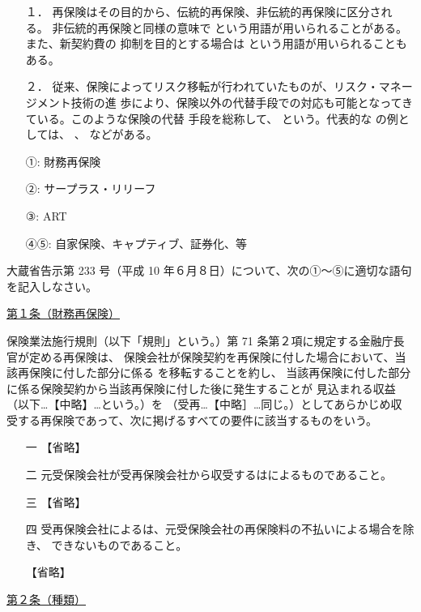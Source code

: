 \documentclass[report,gutter=10mm,fore-edge=10mm,uplatex,dvipdfmx]{jlreq}
\begin{document}
\begin{itemize}
\item[１．] 再保険はその目的から、伝統的再保険、非伝統的再保険に区分される。
 非伝統的再保険と同様の意味で
 という用語が用いられることがある。また、新契約費の
 抑制を目的とする場合は
 という用語が用いられることもある。

\item[２．] 
従来、保険によってリスク移転が行われていたものが、リスク・マネージメント技術の進
 歩により、保険以外の代替手段での対応も可能となってきている。このような保険の代替
 手段を総称して、  という。代表的な  の例としては、
 、  などがある。
\end{itemize}
\answer{}
\begin{itemize}
\item[ ①: ] 財務再保険
\item[ ②: ] サープラス・リリーフ
\item[ ③: ] ART
\item[ ④⑤: ] 自家保険、キャプティブ、証券化、等
\end{itemize}

大蔵省告示第 233 号（平成 10 年６月８日）について、次の①～⑤に適切な語句を記入しなさい。

\noindent \underline{第１条（財務再保険）}

保険業法施行規則（以下「規則」という。）第 71 条第２項に規定する金融庁長官が定める再保険は、
保険会社が保険契約を再保険に付した場合において、当該再保険に付した部分に係る
を移転することを約し、
当該再保険に付した部分に係る保険契約から当該再保険に付した後に発生することが
見込まれる収益（以下…【中略】…という。）を
 （受再…【中略］…同じ。）としてあらかじめ収
受する再保険であって、次に掲げるすべての要件に該当するものをいう。

\begin{itemize}
\item[ 一 ]  【省略】
\item[ 二 ]  元受保険会社が受再保険会社から収受するはによるものであること。
\item[ 三 ]  【省略】
\item[ 四 ]  受再保険会社によるは、元受保険会社の再保険料の不払いによる場合を除き、
 できないものであること。
\item[]【省略】
\end{itemize}

\noindent \underline{第２条（種類）}
\end{document}
